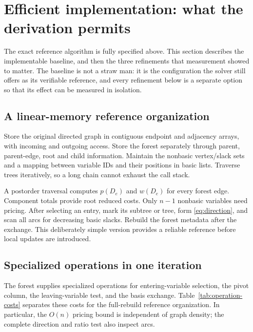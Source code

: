 \section{Efficient implementation: what the derivation permits}\label{sec:implementation}

The exact reference algorithm is fully specified above. This section describes
the implementable baseline, and then the three refinements that measurement
showed to matter. The baseline is not a straw man: it is the configuration the
solver still offers as its verifiable reference, and every refinement below is a
separate option so that its effect can be measured in isolation.

\subsection{A linear-memory reference organization}
Store the original directed graph in contiguous endpoint and adjacency arrays,
with incoming and outgoing access. Store the forest separately through parent,
parent-edge, root and child information. Maintain the nonbasic vertex/slack
sets and a mapping between variable IDs and their positions in basic lists.
Traverse trees iteratively, so a long chain cannot exhaust the call stack.

A postorder traversal computes $p(D_e)$ and $w(D_e)$ for every forest edge.
Component totals provide root reduced costs. Only $n-1$ nonbasic variables
need pricing. After selecting an entry, mark its subtree or tree, form
\eqref{eq:direction}, and scan all arcs for decreasing basic slacks.
Rebuild the forest metadata after the exchange. This deliberately simple
version provides a reliable reference before local updates are introduced.

\subsection{Specialized operations in one iteration}
The forest supplies specialized operations for entering-variable selection,
the pivot column, the leaving-variable test, and the basis exchange.
Table~\ref{tab:operation-costs} separates these costs for the full-rebuild
reference organization. In particular, the $O(n)$ pricing bound is independent
of graph density; the complete direction and ratio test also inspect arcs.


